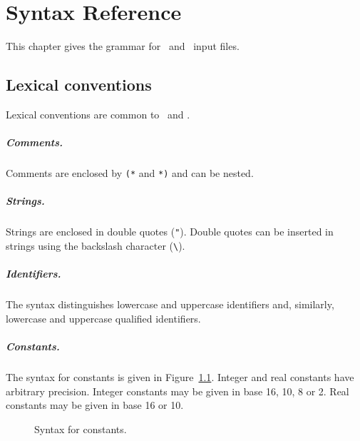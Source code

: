 \chapter{Syntax Reference}
\label{chap:syntaxref}

This chapter gives the grammar for \why\ and \whyml\ input files.

\section{Lexical conventions}

Lexical conventions are common to \why\ and \whyml.


\paragraph{Comments.}
Comments are enclosed by \texttt{(*} and \texttt{*)} and can be nested.

\paragraph{Strings.}
Strings are enclosed in double quotes (\verb!"!). Double quotes can be
inserted in strings using the backslash character (\verb!\!).


\paragraph{Identifiers.} The syntax distinguishes lowercase and
uppercase identifiers and, similarly, lowercase and uppercase
qualified identifiers.

\begin{center}\framebox{}\end{center}

\paragraph{Constants.}
The syntax for constants is given in Figure~\ref{fig:bnf:constant}.
Integer and real constants have arbitrary precision.
Integer constants may be given in base 16, 10, 8 or 2.
Real constants may be given in base 16 or 10.

\begin{figure}
\begin{center}\framebox{}\end{center}
  \caption{Syntax for constants.}
\label{fig:bnf:constant}
\end{figure}

